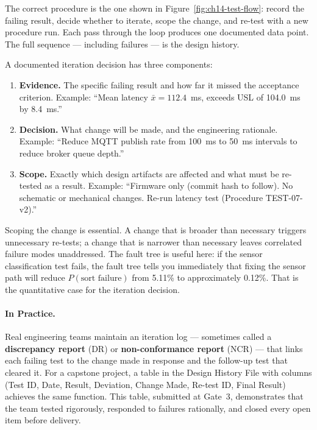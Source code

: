 The correct procedure is the one shown in Figure~\ref{fig:ch14-test-flow}: record the
failing result, decide whether to iterate, scope the change, and re-test with a new
procedure run.
Each pass through the loop produces one documented data point.
The full sequence --- including failures --- is the design history.

A documented iteration decision has
three components:
\begin{enumerate}
  \item \textbf{Evidence.} The specific failing result and how far it missed the
        acceptance criterion.
        Example: ``Mean latency $\bar{x} = 112.4$~ms, exceeds USL of 104.0~ms by
        8.4~ms.''
  \item \textbf{Decision.} What change will be made, and the engineering rationale.
        Example: ``Reduce MQTT publish rate from 100~ms to 50~ms intervals to reduce
        broker queue depth.''
  \item \textbf{Scope.} Exactly which design artifacts are affected and what must be
        re-tested as a result.
        Example: ``Firmware only (commit hash to follow).
        No schematic or mechanical changes.
        Re-run latency test (Procedure TEST-07-v2).''
\end{enumerate}

Scoping the change is essential.
A change that is broader than necessary triggers unnecessary re-tests; a change that is
narrower than necessary leaves correlated failure modes unaddressed.
The fault tree is useful here: if the sensor classification test fails, the fault tree
tells you immediately that fixing the sensor path will reduce $P(\text{sort failure})$
from 5.11\% to approximately 0.12\%.
That is the quantitative case for the iteration decision.

\paragraph{In Practice.}
Real engineering teams maintain an iteration log
--- sometimes called a \textbf{discrepancy report} (DR) or
\textbf{non-conformance report} (NCR) --- that links each
failing test to the change made in response and the follow-up test that cleared it.
For a capstone project, a table in the Design History File with columns
(Test ID, Date, Result, Deviation, Change Made, Re-test ID, Final Result) achieves the
same function.
This table, submitted at Gate~3, demonstrates that the team tested rigorously, responded
to failures rationally, and closed every open item before delivery.

